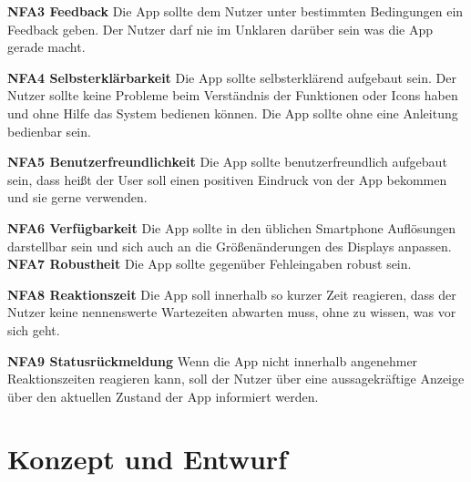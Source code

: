 \documentclass{scrartcl}
\begin{document}
\textbf{NFA3 Feedback} \newline
Die App sollte dem Nutzer unter bestimmten Bedingungen ein Feedback geben.
Der Nutzer darf nie im Unklaren darüber sein was die App gerade macht.

\pagebreak
\textbf{NFA4 Selbsterklärbarkeit} \newline
Die App sollte selbsterklärend aufgebaut sein. Der Nutzer sollte keine Probleme beim Verständnis der Funktionen oder Icons haben und ohne Hilfe das System bedienen können. Die App sollte ohne eine Anleitung bedienbar sein.
\ \newline

\textbf{NFA5 Benutzerfreundlichkeit} \newline
Die App sollte benutzerfreundlich aufgebaut sein, dass heißt der User soll einen positiven Eindruck von der App bekommen und sie gerne verwenden.
\ \newline

\textbf{NFA6 Verfügbarkeit} \newline
Die App sollte in den üblichen Smartphone Auflösungen darstellbar sein und sich auch an die Größenänderungen des Displays anpassen.
\ \newline
\\
\textbf{NFA7 Robustheit} \newline
Die App sollte gegenüber Fehleingaben robust sein.
\ \newline

\textbf{NFA8 Reaktionszeit} \newline
Die App soll innerhalb so kurzer Zeit reagieren, dass der Nutzer keine nennenswerte Wartezeiten abwarten muss, ohne zu wissen, was vor sich geht.
\ \newline

\textbf{NFA9 Statusrückmeldung} \newline
Wenn die App nicht innerhalb angenehmer Reaktionszeiten reagieren kann, soll der Nutzer über eine aussagekräftige Anzeige über den aktuellen Zustand der App informiert werden.
\ \newline



\section{Konzept und Entwurf}
\end{document}
